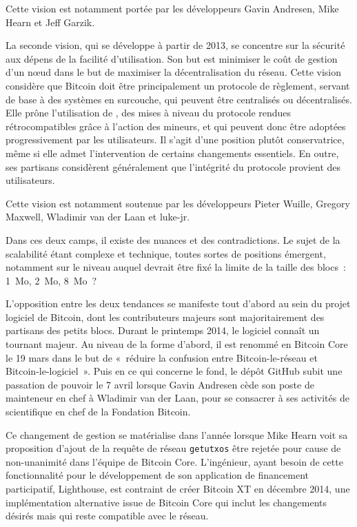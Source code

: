 Cette vision est notamment portée par les développeurs Gavin Andresen, Mike Hearn et Jeff Garzik.

La seconde vision, qui se développe à partir de 2013\sendnote{}, se concentre sur la sécurité aux dépens de la facilité d'utilisation. Son but est minimiser le coût de gestion d'un nœud dans le but de maximiser la décentralisation du réseau. Cette vision considère que Bitcoin doit être principalement un protocole de règlement, servant de base à des systèmes en surcouche, qui peuvent être centralisés ou décentralisés. Elle prône l'utilisation de , des mises à niveau du protocole rendues rétrocompatibles grâce à l'action des mineurs, et qui peuvent donc être adoptées progressivement par les utilisateurs. Il s'agit d'une position plutôt conservatrice, même si elle admet l'intervention de certains changements essentiels. En outre, ses partisans considèrent généralement que l'intégrité du protocole provient des utilisateurs.  %

Cette vision est notamment soutenue par les développeurs Pieter Wuille, Gregory Maxwell, Wladimir van der Laan et luke-jr.

Dans ces deux camps, il existe des nuances et des contradictions. Le sujet de la scalabilité étant complexe et technique, toutes sortes de positions émergent, notamment sur le niveau auquel devrait être fixé la limite de la taille des blocs~: 1~Mo, 2~Mo, 8~Mo~?

L'opposition entre les deux tendances se manifeste tout d'abord au sein du projet logiciel de Bitcoin, dont les contributeurs majeurs sont majoritairement des partisans des petits blocs. Durant le printemps 2014, le logiciel connaît un tournant majeur. Au niveau de la forme d'abord, il est renommé en Bitcoin Core le 19 mars dans le but de «~réduire la confusion entre Bitcoin-le-réseau et Bitcoin-le-logiciel~». Puis en ce qui concerne le fond, le dépôt GitHub subit une passation de pouvoir le 7 avril lorsque Gavin Andresen cède son poste de mainteneur en chef à Wladimir van der Laan, pour se consacrer à ses activités de scientifique en chef de la Fondation Bitcoin.

Ce changement de gestion se matérialise dans l'année lorsque Mike Hearn voit sa proposition d'ajout de la requête de réseau \verb?getutxos? être rejetée pour cause de non-unanimité dans l'équipe de Bitcoin Core. L'ingénieur, ayant besoin de cette fonctionnalité pour le développement de son application de financement participatif, Lighthouse, est contraint de créer Bitcoin XT en décembre 2014, une implémentation alternative issue de Bitcoin Core qui inclut les changements désirés mais qui reste compatible avec le réseau.

